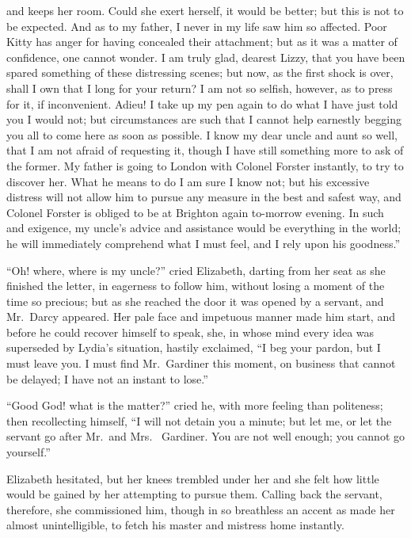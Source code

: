 and keeps her room.  Could she exert herself, it would be better;
but this is not to be expected.  And as to my father, I never in
my life saw him so affected.  Poor Kitty has anger for having
concealed their attachment; but as it was a matter of confidence,
one cannot wonder.  I am truly glad, dearest Lizzy, that you
have been spared something of these distressing scenes; but
now, as the first shock is over, shall I own that I long for
your return?  I am not so selfish, however, as to press for it,
if inconvenient.  Adieu!  I take up my pen again to do what I
have just told you I would not; but circumstances are such that
I cannot help earnestly begging you all to come here as soon as
possible.  I know my dear uncle and aunt so well, that I am not
afraid of requesting it, though I have still something more to
ask of the former.  My father is going to London with Colonel
Forster instantly, to try to discover her.  What he means to do
I am sure I know not; but his excessive distress will not allow
him to pursue any measure in the best and safest way, and
Colonel Forster is obliged to be at Brighton again to-morrow
evening.  In such and exigence, my uncle's advice and assistance
would be everything in the world; he will immediately comprehend
what I must feel, and I rely upon his goodness.''
\bigskip

``Oh! where, where is my uncle?'' cried Elizabeth, darting from
her seat as she finished the letter, in eagerness to follow him,
without losing a moment of the time so precious; but as she
reached the door it was opened by a servant, and Mr.\ Darcy
appeared.  Her pale face and impetuous manner made him start,
and before he could recover himself to speak, she, in whose
mind every idea was superseded by Lydia's situation, hastily
exclaimed, ``I beg your pardon, but I must leave you.  I must
find Mr.\ Gardiner this moment, on business that cannot be
delayed; I have not an instant to lose.''

``Good God! what is the matter?'' cried he, with more feeling
than politeness; then recollecting himself, ``I will not detain you
a minute; but let me, or let the servant go after Mr.\ and Mrs.\ %
Gardiner.  You are not well enough; you cannot go yourself.''

Elizabeth hesitated, but her knees trembled under her and she
felt how little would be gained by her attempting to pursue them.
Calling back the servant, therefore, she commissioned him,
though in so breathless an accent as made her almost unintelligible,
to fetch his master and mistress home instantly.

